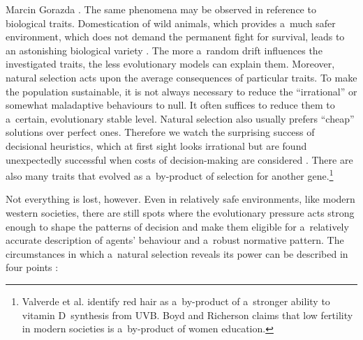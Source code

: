 \begin{artengenv}{Marcin Gorazda}
\parencite[][]{henrich_weirdest_2020}. %
 The same phenomena may be observed in reference to biological traits. Domestication of wild animals, which provides a~much safer environment, which does not demand the permanent fight for survival, leads to an astonishing biological variety 
\parencite[][]{hare_survival_2020}. %
 The more a~random drift influences the investigated traits, the less evolutionary models can explain them. Moreover, natural selection acts upon the average consequences of particular traits. To make the population sustainable, it is not always necessary to reduce the ``irrational'' or somewhat maladaptive behaviours to null. It often suffices to reduce them to a~certain, evolutionary stable level. Natural selection also usually prefers ``cheap'' solutions over perfect ones. Therefore we watch the surprising success of decisional heuristics, which at first sight looks irrational but are found unexpectedly successful when costs of decision-making are considered 
\parencite[][]{gigerenzer_homo_2009}. %
 There are also many traits that evolved as a~by-product of selection for another gene.\footnote{Valverde et al. 
\parencite*[][]{valverde_variants_1995} %
 identify red hair as a~by-product of a~stronger ability to vitamin D~synthesis from UVB. Boyd and Richerson claims 
\parencite*[][]{richerson_not_2005} %
 that low fertility in modern societies is a~by-product of women education.}

Not everything is lost, however. Even in relatively safe environments, like modern western societies, there are still spots where the evolutionary pressure acts strong enough to shape the patterns of decision and make them eligible for a~relatively accurate description of agents' behaviour and a~robust normative pattern. The circumstances in which a~natural selection reveals its power can be described in four points
\parencite[][]{mouden_what_2012}:%



\end{artengenv}
